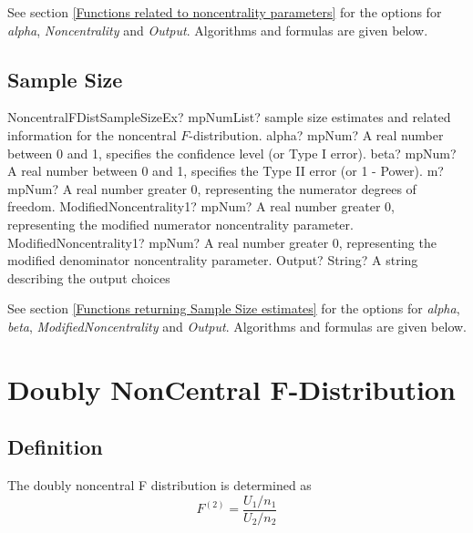 \vspace{0.3cm}
See section \ref{Functions related to noncentrality parameters} for the options for  {\itshape\sffamily alpha}, {\itshape\sffamily Noncentrality} and {\itshape\sffamily Output}. Algorithms and formulas are given below.




\subsection{Sample Size}
\label{NonCentralFDistributionSampleSize}


\begin{mpFunctionsExtract}
	\mpFunctionSixNotImplemented
	{NoncentralFDistSampleSizeEx? mpNumList? sample size estimates and related information for the noncentral $F$-distribution.}
	{alpha? mpNum? A real number between 0 and 1, specifies the confidence level (or Type I error).}
	{beta? mpNum?  A real number between 0 and 1, specifies the Type II error (or 1 - Power).}
	{m? mpNum? A real number greater 0, representing the numerator  degrees of freedom.}
	{ModifiedNoncentrality1? mpNum? A real number greater 0, representing the modified numerator noncentrality parameter.}
	{ModifiedNoncentrality1? mpNum? A real number greater 0, representing the modified denominator noncentrality parameter.}
	{Output? String? A string describing the output choices}
\end{mpFunctionsExtract}


\vspace{0.3cm}
See section \ref{Functions returning Sample Size estimates} for the options for  {\itshape\sffamily alpha}, {\itshape\sffamily beta}, {\itshape\sffamily ModifiedNoncentrality} and {\itshape\sffamily Output}. Algorithms and formulas are given below.






\newpage
\section{Doubly NonCentral F-Distribution}
\label{DoublyNonCentralFDistribution}

\subsection{Definition}
\label{DoublyNonCentralFDistributionDefinition}
The doubly noncentral F distribution is determined as
\begin{equation}
	F^{(2)} = \frac{U_1/n_1}{U_2/n_2}
\end{equation}

